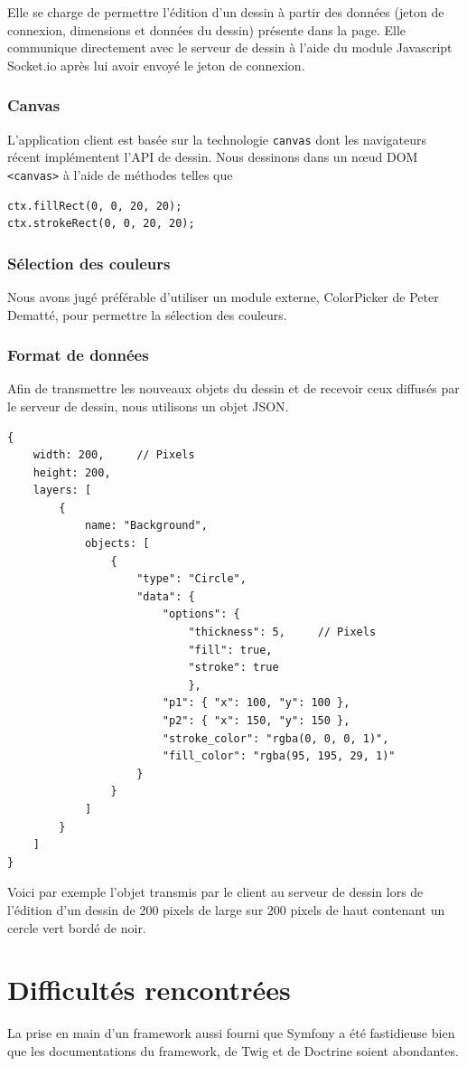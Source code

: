 \documentclass[a4paper]{article}
\begin{document}
Elle se charge de permettre l'édition d'un dessin à partir des données (jeton de connexion, dimensions et données du dessin) présente dans la page. Elle communique directement avec le serveur de dessin à l'aide du module Javascript Socket.io après lui avoir envoyé le jeton de connexion.

\subsubsection{Canvas}
L'application client est basée sur la technologie \texttt{canvas} dont les navigateurs récent implémentent l'API de dessin. Nous dessinons dans un nœud DOM \texttt{<canvas>} à l'aide de méthodes telles que
\begin{lstlisting}
ctx.fillRect(0, 0, 20, 20);
ctx.strokeRect(0, 0, 20, 20);
\end{lstlisting}

\subsubsection{Sélection des couleurs}
Nous avons jugé préférable d'utiliser un module externe, \cite{ColorPicker}ColorPicker de Peter Dematté, pour permettre la sélection des couleurs.

\subsubsection{Format de données}
Afin de transmettre les nouveaux objets du dessin et de recevoir ceux diffusés par le serveur de dessin, nous utilisons un objet JSON.
\begin{lstlisting}
{
	width: 200,		// Pixels
	height: 200,
	layers: [
		{
			name: "Background",
			objects: [
				{
					"type": "Circle",
					"data": {
						"options": {
							"thickness": 5,		// Pixels
							"fill": true,
							"stroke": true
							},
						"p1": { "x": 100, "y": 100 },
						"p2": { "x": 150, "y": 150 },
						"stroke_color": "rgba(0, 0, 0, 1)",
						"fill_color": "rgba(95, 195, 29, 1)"
					}
				}
			]
		}
	]
}
\end{lstlisting}
Voici par exemple l'objet transmis par le client au serveur de dessin lors de l'édition d'un dessin de 200 pixels de large sur 200 pixels de haut contenant un cercle vert bordé de noir.

\section{Difficultés rencontrées}
La prise en main d'un framework aussi fourni que Symfony a été fastidieuse bien que les documentations du framework, de Twig et de Doctrine soient abondantes.
\end{document}
